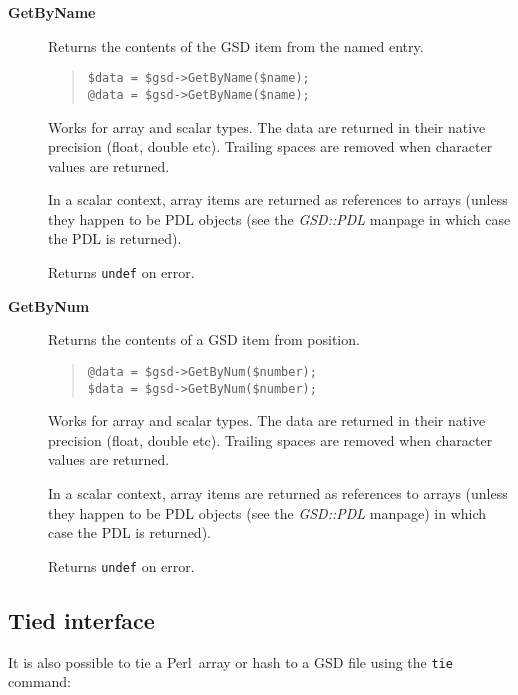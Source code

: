 \documentclass[twoside,11pt]{article}
\newenvironment{myquote}{\begin{quote}\begin{small}}{\end{small}\end{quote}}
\newcommand{\perl}{\xref{\textsf{Perl}}{sun193}{}}
\newcommand{\xref}[3]{#1}
\renewcommand{\_}{\texttt{\symbol{95}}}
\begin{document}
\begin{description}
\item[\textbf{GetByName}] \mbox{}

Returns the contents of the GSD item from the named entry.

\begin{myquote}
\begin{verbatim}
$data = $gsd->GetByName($name);
@data = $gsd->GetByName($name);
\end{verbatim} 
\end{myquote} %

Works for array and scalar types. The data are returned in their native
precision (float, double etc).  Trailing spaces are removed when character
values are returned.

In a scalar context, array items are returned as references to arrays (unless
they happen to be PDL objects (see the \emph{GSD::PDL} manpage in which case
the PDL is returned).

Returns \texttt{undef} on error.

\item[\textbf{GetByNum}] \mbox{}

Returns the contents of a GSD item from position.

\begin{myquote}
\begin{verbatim}
@data = $gsd->GetByNum($number);
$data = $gsd->GetByNum($number);
\end{verbatim}
\end{myquote} %

Works for array and scalar types. The data are returned in their
native precision (float, double etc).  Trailing spaces are removed
when character values are returned.

In a scalar context, array items are returned as references to
arrays (unless they happen to be PDL objects (see the \emph{GSD::PDL} manpage)
in which case the PDL is returned).

Returns \texttt{undef} on error.

\end{description}

\subsection{Tied interface\label{TIED_INTERFACE}}

It is also possible to tie a \perl\ array or hash to a GSD file
using the \texttt{tie} command:
\end{document}
